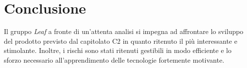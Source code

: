 \documentclass[../nStudioDiFattibilita.tex]{subfiles}
\begin{document}
\section{Conclusione}
Il gruppo \textit{Leaf} a fronte di un'attenta analisi si impegna ad affrontare lo sviluppo del prodotto previsto dal capitolato C2 in quanto ritenuto il più interessante e stimolante. Inoltre, i rischi sono stati ritenuti gestibili in modo efficiente e lo sforzo necessario all'apprendimento delle tecnologie fortemente motivante.
\end{document}
